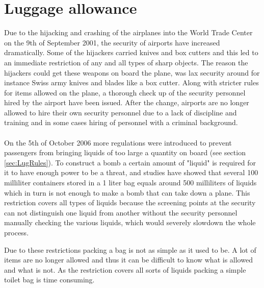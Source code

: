 \section{Luggage allowance}

Due to the hijacking and crashing of the airplanes into the World Trade Center on the 9th of September 2001, the security of airports have increased dramatically. Some of the hijackers carried knives and box cutters and this led to an immediate restriction of any and all types of sharp objects. The reason the hijackers could get these weapons on board the plane, was lax security around for instance Swiss army knives and blades like a box cutter. Along with stricter rules for items allowed on the plane, a thorough check up of the security personnel hired by the airport have been issued. After the change, airports are no longer allowed to hire their own security personnel due to a lack of discipline and training and in some cases hiring of personnel with a criminal background.\citep{Stricter_rules}\\
\\
On the 5th of October 2006 more regulations were introduced to prevent passengers from bringing liquids of too large a quantity on board (see section \ref{sec:LugRules}). To construct a bomb a certain amount of "liquid" is required for it to have enough power to be a threat, and studies have showed that several 100 milliliter containers stored in a 1 liter bag equals around 500 milliliters of liquids which in turn is not enough to make a bomb that can take down a plane. This restriction covers all types of liquids because the screening points at the security can not distinguish one liquid from another without the security personnel manually checking the various liquids, which would severely slowdown the whole process.\citep{Why_rules}\newline

Due to these restrictions packing a bag is not as simple as it used to be. A lot of items are no longer allowed and thus it can be difficult to know what is allowed and what is not. As the restriction covers all sorts of liquids packing a simple toilet bag is time consuming.
